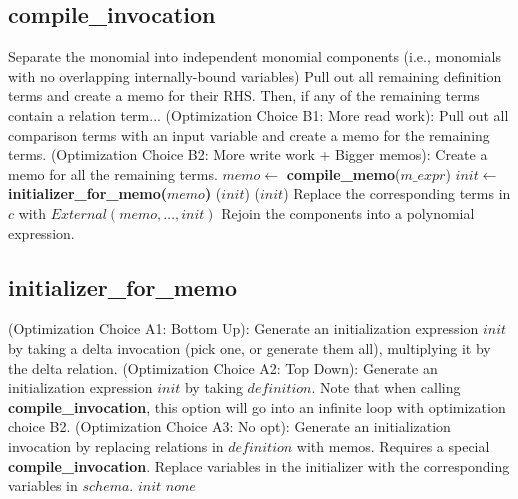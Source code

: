 \documentclass[11pt]{amsart}
\begin{document}
\subsection{compile\_invocation}
\begin{algorithmic}
\STATE Separate the monomial into independent monomial components (i.e., monomials with no overlapping internally-bound variables)
  \STATE Pull out all remaining definition terms and create a memo for their RHS.  Then, if any of the remaining terms contain a relation term...
  \STATE (Optimization Choice B1: More read work): Pull out all comparison terms with an input variable and create a memo for the remaining terms.
  \STATE (Optimization Choice B2: More write work + Bigger memos): Create a memo for all the remaining terms.
    \STATE $memo \gets$ {\bf compile\_memo}($m\_expr$)
    \STATE $init \gets$ {\bf initializer\_for\_memo($memo$)}
    ($init$)
    ($init$)
    \STATE Replace the corresponding terms in $c$ with $External(memo, \ldots, init)$
  \ENDFOR
\ENDFOR
\STATE Rejoin the components into a polynomial expression.
\end{algorithmic}

\subsection{initializer\_for\_memo}
\begin{algorithmic}
  \STATE (Optimization Choice A1: Bottom Up): Generate an initialization expression $init$ by taking a delta invocation (pick one, or generate them all), multiplying it by the delta relation.
  \STATE (Optimization Choice A2: Top Down): Generate an initialization expression $init$ by taking $definition$.  Note that when calling {\bf compile\_invocation}, this option will go into an infinite loop with optimization choice B2.
  \STATE (Optimization Choice A3: No opt): Generate an initialization invocation by replacing relations in $definition$ with memos.  Requires a special {\bf compile\_invocation}.
  \STATE Replace variables in the initializer with the corresponding variables in $schema$.
  \RETURN $init$
\ELSE
  \RETURN $none$
\ENDIF
\end{algorithmic}
\end{document}
